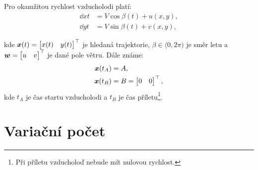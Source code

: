 \documentclass[reqno, a4paper]{amsart}
\numberwithin{equation}{section}
\begin{document}
Pro okamžitou rychlost vzducholodi platí:
\begin{equation} 
\label{rce1}
\begin{split}
\dd{x}{t} & = V \cos \beta(t) + u(x,y), \\
\dd{y}{t} & = V \sin \beta(t) + v(x,y),
\end{split}
\end{equation}

kde $
\bm{x}(t)=
  \begin{bmatrix}
    x(t) &
    y(t)
  \end{bmatrix}
^\top
$ je hledaná trajektorie, $\beta \in \langle 0, 2 \pi)$ je směr letu a $
\vec{w}
=
\transpose{
  \begin{bmatrix}
    u &
    v
  \end{bmatrix}
}
$ je dané pole větru. Dále známe:
\begin{subequations}
  \label{eq:1}
  \begin{align}
    \label{eq:2}
    \bm{x}(t_{A})& = A, \\
    \label{eq:3}
    \bm{x}(t_{B})& = B = 
  \begin{bmatrix}
    0 &
    0
  \end{bmatrix}
^\top,
  \end{align}
\end{subequations}
kde $t_{A}$ je čas startu vzducholodi a $t_{B}$ je čas příletu\footnote{Při příletu vzducholoď nebude mít nulovou rychlost.}. 

\section{Variační počet}
\label{sec:Variační počet}
\end{document}
